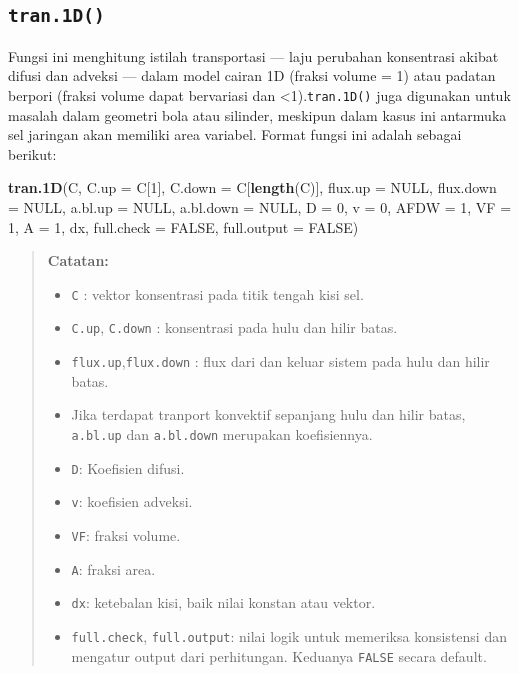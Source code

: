 \documentclass[]{book}
\newenvironment{Shaded}{\begin{snugshade}}{\end{snugshade}}
\newcommand{\DataTypeTok}[1]{\textcolor[rgb]{0.13,0.29,0.53}{#1}}
\newcommand{\DecValTok}[1]{\textcolor[rgb]{0.00,0.00,0.81}{#1}}
\newcommand{\KeywordTok}[1]{\textcolor[rgb]{0.13,0.29,0.53}{\textbf{#1}}}
\newcommand{\NormalTok}[1]{#1}
\newcommand{\OtherTok}[1]{\textcolor[rgb]{0.56,0.35,0.01}{#1}}
\providecommand{\tightlist}{%
  \setlength{\itemsep}{0pt}\setlength{\parskip}{0pt}}
\theoremstyle{definition}
\theoremstyle{definition}
\theoremstyle{definition}
\theoremstyle{remark}
\begin{document}
\hypertarget{tran.1d}{%
\subsection{\texorpdfstring{\texttt{tran.1D()}}{tran.1D()}}\label{tran.1d}}

Fungsi ini menghitung istilah transportasi --- laju perubahan konsentrasi akibat difusi dan adveksi --- dalam model cairan 1D (fraksi volume = 1) atau padatan berpori (fraksi volume dapat bervariasi dan \textless{}1).\texttt{tran.1D()} juga digunakan untuk masalah dalam geometri bola atau silinder, meskipun dalam kasus ini antarmuka sel jaringan akan memiliki area variabel. Format fungsi ini adalah sebagai berikut:

\begin{Shaded}
\begin{Highlighting}[]
\KeywordTok{tran.1D}\NormalTok{(C, }\DataTypeTok{C.up =}\NormalTok{ C[}\DecValTok{1}\NormalTok{], }\DataTypeTok{C.down =}\NormalTok{ C[}\KeywordTok{length}\NormalTok{(C)], }
        \DataTypeTok{flux.up =} \OtherTok{NULL}\NormalTok{, }\DataTypeTok{flux.down =} \OtherTok{NULL}\NormalTok{, }
        \DataTypeTok{a.bl.up =} \OtherTok{NULL}\NormalTok{, }\DataTypeTok{a.bl.down =} \OtherTok{NULL}\NormalTok{, }\DataTypeTok{D =} \DecValTok{0}\NormalTok{, }
        \DataTypeTok{v =} \DecValTok{0}\NormalTok{, }\DataTypeTok{AFDW =} \DecValTok{1}\NormalTok{, }\DataTypeTok{VF =} \DecValTok{1}\NormalTok{, }\DataTypeTok{A =} \DecValTok{1}\NormalTok{, dx, }
        \DataTypeTok{full.check =} \OtherTok{FALSE}\NormalTok{, }\DataTypeTok{full.output =} \OtherTok{FALSE}\NormalTok{)}
\end{Highlighting}
\end{Shaded}

\begin{quote}
\textbf{Catatan:}

\begin{itemize}
\tightlist
\item
  \texttt{C} : vektor konsentrasi pada titik tengah kisi sel.
\item
  \texttt{C.up}, \texttt{C.down} : konsentrasi pada hulu dan hilir batas.
\item
  \texttt{flux.up},\texttt{flux.down} : flux dari dan keluar sistem pada hulu dan hilir batas.
\item
  Jika terdapat tranport konvektif sepanjang hulu dan hilir batas, \texttt{a.bl.up} dan \texttt{a.bl.down} merupakan koefisiennya.
\item
  \texttt{D}: Koefisien difusi.
\item
  \texttt{v}: koefisien adveksi.
\item
  \texttt{VF}: fraksi volume.
\item
  \texttt{A}: fraksi area.
\item
  \texttt{dx}: ketebalan kisi, baik nilai konstan atau vektor.
\item
  \texttt{full.check}, \texttt{full.output}: nilai logik untuk memeriksa konsistensi dan mengatur output dari perhitungan. Keduanya \texttt{FALSE} secara default.
\end{itemize}
\end{quote}
\end{document}
